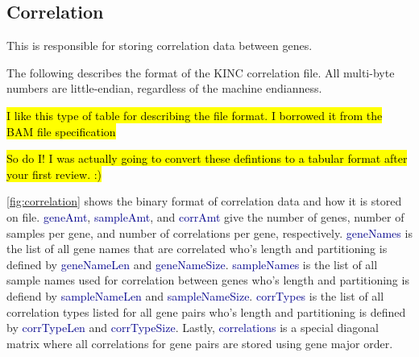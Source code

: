 \documentclass[10pt]{article}
\providecommand{\stephen}[1]{\sethlcolor{lyellow}\hl{#1}}
\providecommand{\josh}[1]{\sethlcolor{lblue}\hl{#1}}
\providecommand{\h}[1]{\textcolor{darkblue}{#1}}
\begin{document}
\subsection{Correlation}

This is responsible for storing correlation data between genes.

The following describes the format of the KINC correlation file. All 
multi-byte numbers are little-endian, regardless of the machine endianness.

\stephen{I like this type of table for describing the file format. I borrowed 
it from the BAM file specification}

\josh{So do I! I was actually going to convert these defintions to a tabular 
format after your first review. :)}

\autoref{fig:correlation} shows the binary format of correlation data and how 
it is stored on file. \h{geneAmt}, \h{sampleAmt}, and \h{corrAmt} give the 
number of genes, number of samples per gene, and number of correlations per 
gene, respectively. \h{geneNames} is the list of all gene names that are 
correlated who's length and partitioning is defined by \h{geneNameLen} and 
\h{geneNameSize}. \h{sampleNames} is the list of all sample names used for 
correlation between genes who's length and partitioning is defiend by 
\h{sampleNameLen} and \h{sampleNameSize}. \h{corrTypes} is the list of all 
correlation types listed for all gene pairs who's length and partitioning is 
defined by \h{corrTypeLen} and \h{corrTypeSize}. Lastly, \h{correlations} is a 
special diagonal matrix where all correlations for gene pairs are stored using 
gene major order.
\end{document}
